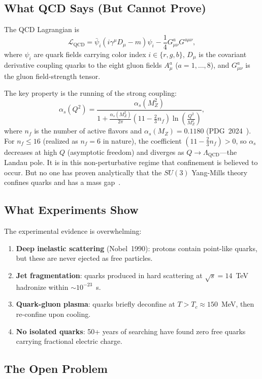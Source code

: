 \documentclass[11pt,a4paper]{article}
\theoremstyle{plain}
\theoremstyle{definition}
\theoremstyle{remark}
\newcommand{\beq}{\begin{equation}}
\newcommand{\eeq}{\end{equation}}
\newcommand{\LQCD}{\Lambda_{\mathrm{QCD}}}
\begin{document}
\subsection{What QCD Says (But Cannot Prove)}

The QCD Lagrangian is
\beq\label{eq:qcd}
  \mathcal{L}_{\mathrm{QCD}} = \bar{\psi}_i
  (i\gamma^\mu D_\mu - m)\psi_i
  - \frac{1}{4} G^a_{\mu\nu} G^{a\mu\nu},
\eeq
where $\psi_i$ are quark fields carrying color index
$i \in \{r,g,b\}$, $D_\mu$ is the covariant derivative coupling
quarks to the eight gluon fields $A^a_\mu$ ($a = 1,\ldots,8$),
and $G^a_{\mu\nu}$ is the gluon field-strength tensor.

The key property is the running of the strong coupling:
\beq\label{eq:running}
  \alpha_s(Q^2) = \frac{\alpha_s(M_Z^2)}
    {1 + \frac{\alpha_s(M_Z^2)}{2\pi}
    (11 - \tfrac{2}{3}n_f) \ln\!\left(\frac{Q^2}{M_Z^2}\right)},
\eeq
where $n_f$ is the number of active flavors and
$\alpha_s(M_Z) = 0.1180$ (PDG~2024~\cite{pdg2024}).  For
$n_f \leq 16$ (realized as $n_f = 6$ in nature), the coefficient
$(11 - \frac{2}{3}n_f) > 0$, so $\alpha_s$ decreases at high $Q$
(asymptotic freedom) and diverges as $Q \to \LQCD$---the Landau
pole.  It is in this non-perturbative regime that confinement is
believed to occur.  But no one has proven analytically that the
$SU(3)$ Yang-Mills theory confines quarks and has a mass
gap~\cite{jaffe2006quantum}.

\subsection{What Experiments Show}

The experimental evidence is overwhelming:
\begin{enumerate}
\item \textbf{Deep inelastic scattering} (Nobel~1990): protons
  contain point-like quarks, but these are never ejected as free
  particles.
\item \textbf{Jet fragmentation}: quarks produced in hard
  scattering at $\sqrt{s} = 14$~TeV hadronize within
  $\sim 10^{-23}$~s.
\item \textbf{Quark-gluon plasma}: quarks briefly deconfine at
  $T > T_c \approx 150$~MeV, then re-confine upon cooling.
\item \textbf{No isolated quarks}: 50+ years of searching have
  found zero free quarks carrying fractional electric charge.
\end{enumerate}

\subsection{The Open Problem}
\end{document}
